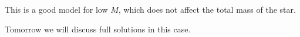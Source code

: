 \documentclass[main.tex]{subfiles}
\begin{document}


This is a good model for low \(\dot{M} \), which does not affect the total mass of the star.

Tomorrow we will discuss full solutions in this case.
\end{document}
